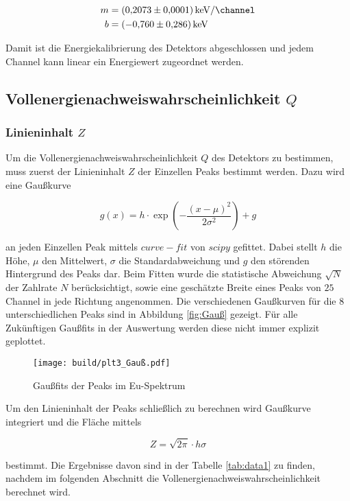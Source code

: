 \begin{align*}
	m & =\qty[per-mode=fraction]{0.2073(0.0001)}{\kilo\eV\per\channel} \\
	b & =\qty{-0.760(0.286)}{\kilo\eV}
\end{align*}

Damit ist die Energiekalibrierung des Detektors abgeschlossen und jedem Channel
kann linear ein Energiewert zugeordnet werden.

\subsection{Vollenergienachweiswahrscheinlichkeit $Q$}
\subsubsection{Linieninhalt $Z$}
Um die Vollenergienachweiswahrscheinlichkeit $Q$ des Detektors zu bestimmen,
muss zuerst der Linieninhalt $Z$ der Einzellen Peaks bestimmt werden. Dazu wird
eine Gaußkurve

\begin{equation}
	g(x)=h\cdot \exp(-\frac{(x-\mu )^2}{2\sigma^2})+g
	\label{eq:Gauß}
\end{equation}

an jeden Einzellen Peak mittels $curve-fit$ von $scipy$ \cite{scipy} gefittet.
Dabei stellt $h$ die Höhe, $\mu$ den Mittelwert, $\sigma$ die
Standardabweichung und $g$ den störenden Hintergrund des Peaks dar. Beim Fitten
wurde die statistische Abweichung $\sqrt{N}$ der Zahlrate $N$ berücksichtigt,
sowie eine geschätzte Breite eines Peaks von $25$ Channel in jede Richtung
angenommen. Die verschiedenen Gaußkurven für die 8 unterschiedlichen Peaks sind
in Abbildung \eqref{fig:Gauß} gezeigt. Für alle Zukünftigen Gaußfits in der
Auswertung werden diese nicht immer explizit geplottet.

\begin{figure}
	\centering
	\texttt{[image: build/plt3\_Gauß.pdf]}
	\caption{Gaußfits der Peaks im Eu-Spektrum}
	\label{fig:Gauß}
\end{figure}

Um den Linieninhalt der Peaks schließlich zu berechnen wird Gaußkurve
integriert und die Fläche mittels

\begin{equation}
	Z=\sqrt{2\pi}\cdot h\sigma
	\label{eq:Z}
\end{equation}

bestimmt. Die Ergebnisse davon sind in der Tabelle \ref{tab:data1} zu finden,
nachdem im folgenden Abschnitt die Vollenergienachweiswahrscheinlichkeit
berechnet wird.

